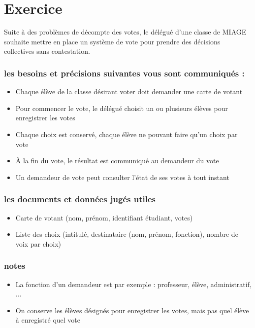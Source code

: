 \section*{Exercice}
Suite à des problèmes de décompte des votes, le délégué d'une classe de MIAGE 
souhaite mettre en place un système de vote pour prendre des décisions 
collectives sans contestation.

\subsubsection*{les besoins et précisions suivantes vous sont communiqués :}
\begin{itemize}
    \item Chaque élève de la classe désirant voter doit demander une carte de votant
    \item Pour commencer le vote, le délégué choisit un ou plusieurs élèves pour enregistrer les votes
    \item Chaque choix est conservé, chaque élève ne pouvant faire qu'un choix par vote
    \item À la fin du vote, le résultat est communiqué au demandeur du vote
    \item Un demandeur de vote peut consulter l'état de ses votes à tout instant
\end{itemize}

\subsubsection*{les documents et données jugés utiles}
\begin{itemize}
    \item Carte de votant (nom, prénom, identifiant étudiant, votes)
    \item Liste des choix (intitulé, destinataire (nom, prénom, fonction), nombre de voix par choix)
\end{itemize}

\subsubsection*{notes}
\begin{itemize}
    \item La fonction d'un demandeur est par exemple : professeur, élève, administratif, ...
    \item On conserve les élèves désignés pour enregistrer les votes, mais pas quel élève à enregistré quel vote
\end{itemize}
